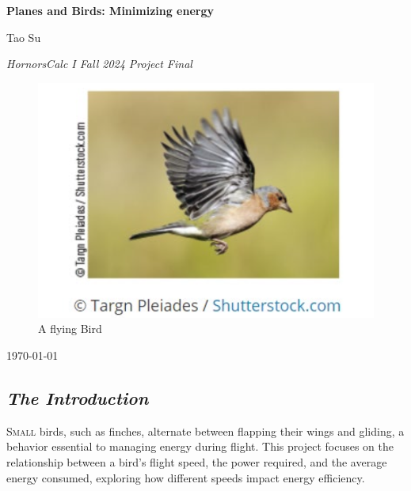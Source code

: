 \documentclass{article}
\begin{document}
\begin{titlepage}
    \centering
    \vspace*{1cm}
    
    \Huge
    \textbf{Planes and Birds: Minimizing energy}
    
    \vspace{0.5cm}
    
    \Large
    Tao Su
    \vspace{1.5cm}

    \large 
    \textit{HornorsCalc I Fall 2024 Project Final}
    \vfill

    \begin{figure}[h]
        \centering
        \includegraphics[width=1\textwidth]{coverPage.png}
        \caption{\small A flying Bird}
        \label{fig:cover}
    \end{figure}
            
    \Large
    \today  %
    
\end{titlepage}

\newpage

\subsection*{\itshape \large The Introduction}


\lettrine[lines=2]{S}{mall} birds, such as finches, alternate between flapping their wings and gliding, a behavior essential to managing energy during flight. This project focuses on the relationship between a bird’s flight speed, the power required, and the average energy consumed, exploring how different speeds impact energy efficiency.
\end{document}
